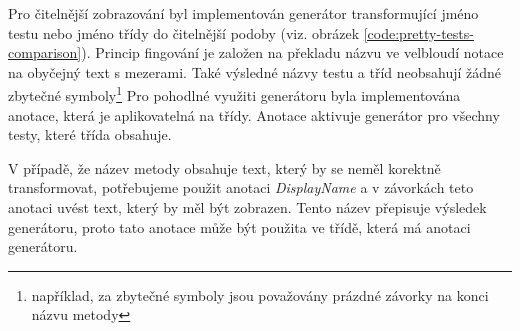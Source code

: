     Pro čitelnější zobrazování byl implementován generátor transformující jméno testu nebo jméno třídy do čitelnější podoby (viz. obrázek \ref{code:pretty-tests-comparison}). Princip fingování je založen na překladu názvu ve velbloudí notace na obyčejný text s mezerami. Také výsledné názvy testu a tříd neobsahují žádné zbytečné symboly\footnote{například, za zbytečné symboly jsou považovány prázdné závorky na konci názvu metody} Pro pohodlné využiti generátoru byla implementována anotace, která je aplikovatelná na třídy. Anotace aktivuje generátor pro všechny testy, které třída obsahuje. 
    
    V případě, že název metody obsahuje text, který by se neměl korektně transformovat, potřebujeme použit anotaci \textit{DisplayName} a v závorkách teto anotaci uvést text, který by měl být zobrazen. Tento název přepisuje výsledek generátoru, proto tato anotace může být použita ve třídě, která má anotaci generátoru. 




    
